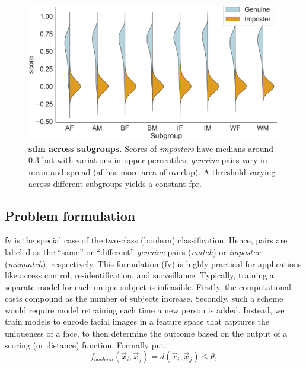 \begin{figure}[t!] 
	\centering
	\centering
	\includegraphics[width=1\linewidth]{figures/violinplots.pdf}
		\caption{\small{\textbf{\Gls{sdm} across subgroups.} Scores of \emph{imposters} have medians around 0.3 but with variations in upper percentiles; \emph{genuine} pairs vary in mean and spread (\eg \gls{af} has more area of overlap). A threshold varying across different subgroups yields a constant \gls{fpr}.}} \label{fig:detection-model} 
\end{figure} 

\subsection{Problem formulation}\label{subsec:pf} 
\Gls{fv} is the special case of the two-class (\ie boolean) classification. Hence, pairs are labeled as the ``same'' or ``different'' \textit{genuine} pairs (\ie \textit{match}) or \textit{imposter} (\ie \textit{mismatch}), respectively. This formulation (\ie \gls{fv}) is highly practical for applications like access control, re-identification, and surveillance. Typically, training a separate model for each unique subject is infeasible. Firstly, the computational costs compound as the number of subjects increase.  Secondly, such a scheme would require model retraining each time a new person is added. Instead, we train models to encode facial images in a feature space that captures the uniqueness of a face, to then determine the outcome based on the output of a scoring (or distance) function. Formally put:
\begin{equation}\label{eg:matcher}
    f_{boolean}(\vec{x}_i, \vec{x}_j) = d(\vec{x}_i, \vec{x}_j) \leq \theta,
\end{equation}

